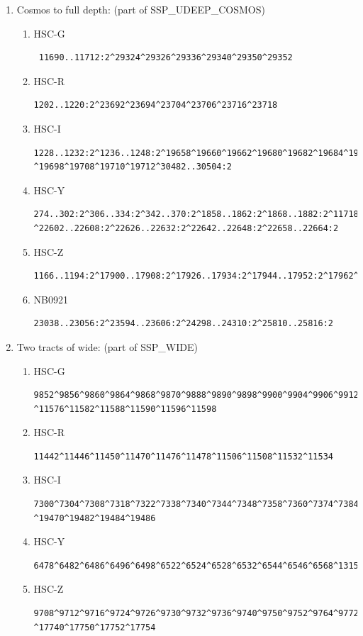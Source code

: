 \documentclass[DM,authoryear,toc]{lsstdoc}
\begin{document}
\begin{enumerate}
\item Cosmos to full depth: (part of SSP{\_}UDEEP{\_}COSMOS)
\begin{enumerate}
\item
HSC-G \begin{verbatim} 11690..11712:2^29324^29326^29336^29340^29350^29352
\end{verbatim}
\item
HSC-R \begin{verbatim}1202..1220:2^23692^23694^23704^23706^23716^23718
\end{verbatim}
\item
HSC-I \begin{verbatim}1228..1232:2^1236..1248:2^19658^19660^19662^19680^19682^19684^19694^19696
^19698^19708^19710^19712^30482..30504:2
\end{verbatim}
\item
HSC-Y \begin{verbatim}274..302:2^306..334:2^342..370:2^1858..1862:2^1868..1882:2^11718..11742:2
^22602..22608:2^22626..22632:2^22642..22648:2^22658..22664:2
\end{verbatim}
\item
HSC-Z \begin{verbatim}1166..1194:2^17900..17908:2^17926..17934:2^17944..17952:2^17962^28354..28402:2
\end{verbatim}
\item
NB0921 \begin{verbatim}23038..23056:2^23594..23606:2^24298..24310:2^25810..25816:2
\end{verbatim}
\end{enumerate}
\item Two tracts of wide: (part of SSP{\_}WIDE)
\begin{enumerate}
\item
HSC-G \begin{verbatim}9852^9856^9860^9864^9868^9870^9888^9890^9898^9900^9904^9906^9912^11568^11572
^11576^11582^11588^11590^11596^11598
\end{verbatim}
\item
HSC-R \begin{verbatim}11442^11446^11450^11470^11476^11478^11506^11508^11532^11534
\end{verbatim}
\item
HSC-I \begin{verbatim}7300^7304^7308^7318^7322^7338^7340^7344^7348^7358^7360^7374^7384^7386^19468
^19470^19482^19484^19486
\end{verbatim}
\item
HSC-Y \begin{verbatim}6478^6482^6486^6496^6498^6522^6524^6528^6532^6544^6546^6568^13152^13154
\end{verbatim}
\item
HSC-Z \begin{verbatim}9708^9712^9716^9724^9726^9730^9732^9736^9740^9750^9752^9764^9772^9774^17738
^17740^17750^17752^17754
\end{verbatim}
\end{enumerate}
\end{enumerate}
\end{document}
